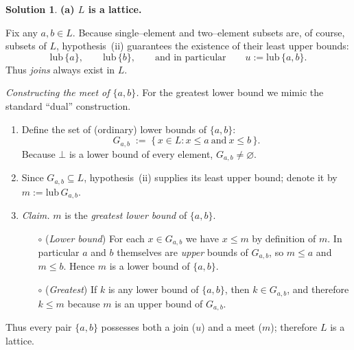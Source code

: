 \documentclass[12pt]{article}
\theoremstyle{definition} %
\newtheorem{solution}{Solution}
\theoremstyle{plain} %
\begin{document}
      \begin{solution}
      \textbf{(a) $L$ is a lattice.}
      
      \medskip
      Fix any $a,b\in L$.  
      Because single–element and two–element subsets are, of course, subsets of $L$, hypothesis~(ii) guarantees the existence of their least upper bounds:
      \[
      \text{lub}\,\{a\},\qquad\text{lub}\,\{b\},\qquad
      \text{and in particular}\qquad
      u:=\text{lub}\,\{a,b\}.
      \]
      Thus \emph{joins} always exist in $L$.
      
      \vspace{.5em}
      \noindent\emph{Constructing the meet of $\{a,b\}$.}
      For the greatest lower bound we mimic the standard “dual” construction.
      
      \begin{enumerate}
          \item Define the set of (ordinary) lower bounds of $\{a,b\}$:
          \[
             G_{a,b}\;:=\;\{\,x\in L : x\le a\ \text{and}\ x\le b\,\}.
          \]
          Because $\bot$ is a lower bound of every element, $G_{a,b}\neq\varnothing$.
      
          \item Since $G_{a,b}\subseteq L$, hypothesis~(ii) supplies its least upper bound;
                denote it by $m:=\text{lub}\,G_{a,b}$.
      
          \item\label{it:meet_is_glb} \emph{Claim.} $m$ is the \emph{greatest lower bound} of $\{a,b\}$.
      
                \begin{enumerate}
                    \item[$\circ$] (\emph{Lower bound})  
                      For each $x\in G_{a,b}$ we have $x\le m$ by definition of $m$.
                      In particular $a$ and $b$ themselves are \emph{upper} bounds of $G_{a,b}$,
                      so $m\le a$ and $m\le b$.  Hence $m$ is a lower bound of $\{a,b\}$.
      
                    \item[$\circ$] (\emph{Greatest})  
                      If $k$ is any lower bound of $\{a,b\}$, then $k\in G_{a,b}$,
                      and therefore $k\le m$ because $m$ is an upper bound of $G_{a,b}$.
                \end{enumerate}
      \end{enumerate}
      Thus every pair $\{a,b\}$ possesses both a join ($u$) and a meet ($m$); therefore $L$ is a lattice.
      

\end{solution}
\end{document}
